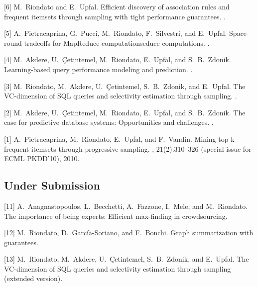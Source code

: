 \documentclass[margin,line]{resume}
\begin{document}
[6] M.~Riondato and E.~Upfal.
\newblock Efficient discovery of association rules and frequent itemsets
  through sampling with tight performance guarantees.
.

[5] A.~Pietracaprina, G.~Pucci, M.~Riondato, F.~Silvestri, and E.~Upfal.
\newblock Space-round tradeoffs for {MapReduce} computationseduce computations.
.

[4] M.~Akdere, U.~\c{C}etintemel, M.~Riondato, E.~Upfal, and S.~B.~Zdonik.
\newblock Learning-based query performance modeling and prediction.
.

[3] M.~Riondato, M.~Akdere, U.~\c{C}etintemel, S.~B.~Zdonik, and E.~Upfal.
\newblock The {VC}-dimension of {SQL} queries and selectivity estimation
  through sampling.
.

[2] M.~Akdere, U.~\c{C}etintemel, M.~Riondato, E.~Upfal, and S.~B.~Zdonik.
\newblock The case for predictive database systems: Opportunities and
  challenges.
.

[1] A.~Pietracaprina, M.~Riondato, E.~Upfal, and F.~Vandin.
\newblock Mining top-k frequent itemsets through progressive sampling.
, 21(2):310--326 (special issue for
ECML PKDD'10), 2010.

\pagebreak
\subsection{\sc \small Under Submission}

[11] A.~Anagnastopoulos, L.~Becchetti, A.~Fazzone, I.~Mele, and M.~Riondato.
\newblock The importance of being experts: Efficient max-finding in
crowdsourcing.

[12] M.~Riondato, D.~Garc\'ia-Soriano, and F.~Bonchi.
\newblock Graph summarization with guarantees.

[13] M.~Riondato, M.~Akdere, U.~\c{C}etintemel, S.~B.~Zdonik, and E.~Upfal.
\newblock The {VC}-dimension of {SQL} queries and selectivity estimation
  through sampling (extended version).
\end{document}
